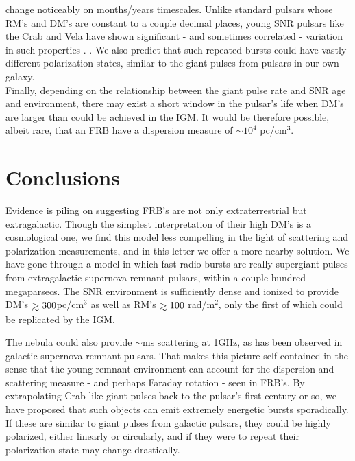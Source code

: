 \documentclass[useAMS,usenatbib]{mn2e}
\def\gtrsim{\mathrel{\hbox{\rlap{\hbox{\lower4pt\hbox{$\sim$}}}\hbox{$>$}}}}
\begin{document}
change noticeably on months/years timescales. Unlike standard pulsars 
whose RM's and DM's are constant to a couple decimal places, young 
SNR pulsars like the Crab and Vela have shown significant - and sometimes
correlated - variation in such properties \citep{1988A&A...202..166R, 2008A&A...483...13K}.
. We also predict that such repeated 
bursts could have vastly different polarization states, similar to the giant 
pulses from pulsars in our own galaxy.
\\
Finally, depending on the relationship between the giant pulse rate and SNR
age and environment, there may exist a short window in the pulsar's life when 
DM's are larger than could be achieved in the IGM. It would be therefore 
possible, albeit rare, that an FRB have a dispersion
 measure of $\sim10^4$ pc/cm$^3$.


\section{Conclusions}
Evidence is piling on suggesting FRB's are not only extraterrestrial
but extragalactic. Though the simplest interpretation of their high DM's 
is a cosmological one, we find this model less compelling in the light of 
scattering and polarization measurements, and in this letter we offer a 
more nearby solution. We have gone through
a model in which fast radio bursts are really supergiant pulses from 
extragalactic supernova remnant pulsars, within a couple hundred megaparsecs. 
The SNR environment is sufficiently
dense and ionized to provide DM's $\gtrsim 300$pc/cm$^3$ as well as 
RM's $\gtrsim 100$ rad/m$^2$, only the first of which could be replicated by the IGM. 

The nebula could also provide $\sim$ms scattering at 1GHz, as has been 
observed in galactic supernova remnant pulsars. 
That makes this picture self-contained in the sense that
the young remnant environment can account for the dispersion 
and scattering measure - and perhaps Faraday rotation - seen in FRB's. 
By extrapolating Crab-like giant pulses back to the pulsar's first century or so,
we have proposed that such objects can emit extremely energetic bursts sporadically. 
If these are similar to giant pulses from galactic pulsars, they could be highly polarized, 
either linearly or circularly, and if they were to repeat their polarization state may 
change drastically. 
\end{document}
